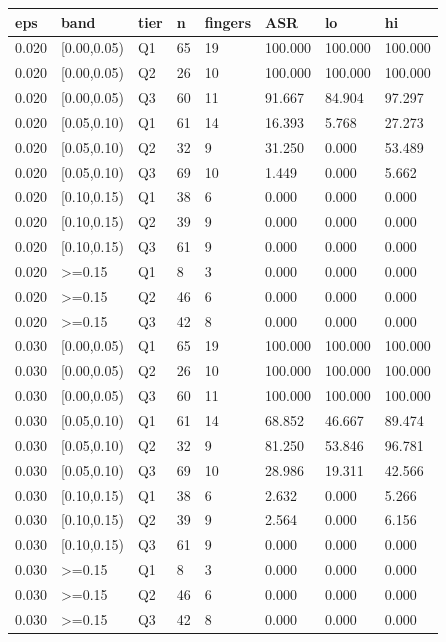 \begin{tabular}{llllllll}
\hline
eps & band & tier & n & fingers & ASR & lo & hi \\
\hline
0.020 & [0.00,0.05) & Q1 & 65 & 19 & 100.000 & 100.000 & 100.000 \\
0.020 & [0.00,0.05) & Q2 & 26 & 10 & 100.000 & 100.000 & 100.000 \\
0.020 & [0.00,0.05) & Q3 & 60 & 11 & 91.667 & 84.904 & 97.297 \\
0.020 & [0.05,0.10) & Q1 & 61 & 14 & 16.393 & 5.768 & 27.273 \\
0.020 & [0.05,0.10) & Q2 & 32 & 9 & 31.250 & 0.000 & 53.489 \\
0.020 & [0.05,0.10) & Q3 & 69 & 10 & 1.449 & 0.000 & 5.662 \\
0.020 & [0.10,0.15) & Q1 & 38 & 6 & 0.000 & 0.000 & 0.000 \\
0.020 & [0.10,0.15) & Q2 & 39 & 9 & 0.000 & 0.000 & 0.000 \\
0.020 & [0.10,0.15) & Q3 & 61 & 9 & 0.000 & 0.000 & 0.000 \\
0.020 & >=0.15 & Q1 & 8 & 3 & 0.000 & 0.000 & 0.000 \\
0.020 & >=0.15 & Q2 & 46 & 6 & 0.000 & 0.000 & 0.000 \\
0.020 & >=0.15 & Q3 & 42 & 8 & 0.000 & 0.000 & 0.000 \\
0.030 & [0.00,0.05) & Q1 & 65 & 19 & 100.000 & 100.000 & 100.000 \\
0.030 & [0.00,0.05) & Q2 & 26 & 10 & 100.000 & 100.000 & 100.000 \\
0.030 & [0.00,0.05) & Q3 & 60 & 11 & 100.000 & 100.000 & 100.000 \\
0.030 & [0.05,0.10) & Q1 & 61 & 14 & 68.852 & 46.667 & 89.474 \\
0.030 & [0.05,0.10) & Q2 & 32 & 9 & 81.250 & 53.846 & 96.781 \\
0.030 & [0.05,0.10) & Q3 & 69 & 10 & 28.986 & 19.311 & 42.566 \\
0.030 & [0.10,0.15) & Q1 & 38 & 6 & 2.632 & 0.000 & 5.266 \\
0.030 & [0.10,0.15) & Q2 & 39 & 9 & 2.564 & 0.000 & 6.156 \\
0.030 & [0.10,0.15) & Q3 & 61 & 9 & 0.000 & 0.000 & 0.000 \\
0.030 & >=0.15 & Q1 & 8 & 3 & 0.000 & 0.000 & 0.000 \\
0.030 & >=0.15 & Q2 & 46 & 6 & 0.000 & 0.000 & 0.000 \\
0.030 & >=0.15 & Q3 & 42 & 8 & 0.000 & 0.000 & 0.000 \\

\end{tabular}
